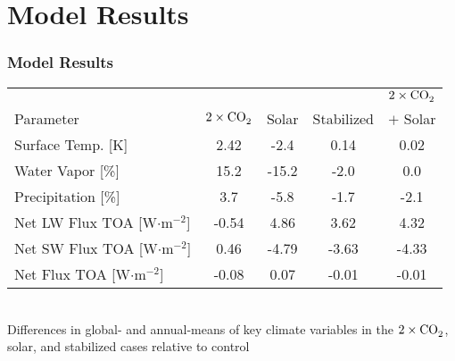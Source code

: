 \documentclass{beamer}
\begin{document}
\section{Model Results}
\begin{frame}
\frametitle{Model Results}
	\begin{center}

	\footnotesize
	\begin{tabular}{ | l | c | c | c | c |}
	\hline
		&  &  &  & $2\times\ce{CO2}$ \\ 
		Parameter & $2\times\ce{CO2}$ & Solar & Stabilized & $+ $ Solar \\ \hline\hline
		Surface Temp. [K] & 2.42 & -2.4 & 0.14 & 0.02 \\ 
		Water Vapor [\%] & 15.2 & -15.2 & -2.0 & 0.0 \\ 
		Precipitation [\%] & 3.7 & -5.8 & -1.7 & -2.1 \\ 
		Net LW Flux TOA [W$\cdot$m$^{-2}$] & -0.54 & 4.86 & 3.62 & 4.32 \\ 
		Net SW Flux TOA [W$\cdot$m$^{-2}$] & 0.46 & -4.79 & -3.63 & -4.33 \\ 
		Net Flux TOA [W$\cdot$m$^{-2}$] & -0.08 & 0.07 & -0.01 & -0.01 \\ \hline
	\end{tabular}
	\\\vspace{0.2cm}\scriptsize Differences in global- and annual-means of key climate variables in the $2\times\ce{CO2}$, solar, and stabilized cases relative to control
	\end{center}
\end{frame}
\end{document}
